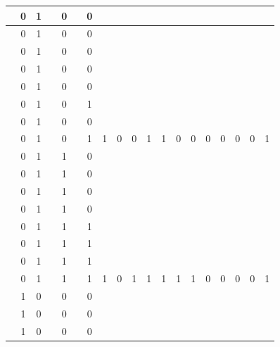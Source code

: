 \begin{table}[!tb]
\begin{tabular}{|c|c|c|c|c|c|c|c|c|c|c|c|c|c|c|c|c|c|c|}
        \rowcolor{red!40}  & 0 & 1 &  & 0 &  & 0 &  &  &  &  &  &  &  &  &  &  &  &  \\ \hline
        \rowcolor{red!40}  & 0 & 1 &  & 0 &  & 0 &  &  &  &  &  &  &  &  &  &  &  &  \\ \hline
        \rowcolor{red!40}  & 0 & 1 &  & 0 &  & 0 &  &  &  &  &  &  &  &  &  &  &  &  \\ \hline
        \rowcolor{red!40}  & 0 & 1 &  & 0 &  & 0 &  &  &  &  &  &  &  &  &  &  &  &  \\ \hline
        \rowcolor{red!40}  & 0 & 1 &  & 0 &  & 0 &  &  &  &  &  &  &  &  &  &  &  &  \\ \hline
        \rowcolor{red!40}  & 0 & 1 &  & 0 &  & 1 &  &  &  &  &  &  &  &  &  &  &  &  \\ \hline
        \rowcolor{red!40}  & 0 & 1 &  & 0 &  & 0 &  &  &  &  &  &  &  &  &  &  &  &  \\ \hline
        \rowcolor{red!40}  & 0 & 1 &  & 0 &  & 1 & 1 & 0 & 0 & 1 & 1 & 0 & 0 & 0 & 0 & 0 & 0 & 1 \\ \hline
        \rowcolor{green!40}  & 0 & 1 &  & 1 &  & 0 &  &  &  &  &  &  &  &  &  &  &  &  \\ \hline
        \rowcolor{green!40}  & 0 & 1 &  & 1 &  & 0 &  &  &  &  &  &  &  &  &  &  &  &  \\ \hline
        \rowcolor{green!40}  & 0 & 1 &  & 1 &  & 0 &  &  &  &  &  &  &  &  &  &  &  &  \\ \hline
        \rowcolor{green!40}  & 0 & 1 &  & 1 &  & 0 &  &  &  &  &  &  &  &  &  &  &  &  \\ \hline
        \rowcolor{green!40}  & 0 & 1 &  & 1 &  & 1 &  &  &  &  &  &  &  &  &  &  &  &  \\ \hline
        \rowcolor{green!40}  & 0 & 1 &  & 1 &  & 1 &  &  &  &  &  &  &  &  &  &  &  &  \\ \hline
        \rowcolor{green!40}  & 0 & 1 &  & 1 &  & 1 &  &  &  &  &  &  &  &  &  &  &  &  \\ \hline
        \rowcolor{green!40}  & 0 & 1 &  & 1 &  & 1 & 1 & 0 & 1 & 1 & 1 & 1 & 1 & 0 & 0 & 0 & 0 & 1 \\ \hline
        \rowcolor{yellow!40}  & 1 & 0 &  & 0 &  & 0 &  &  &  &  &  &  &  &  &  &  &  &  \\ \hline
        \rowcolor{yellow!40}  & 1 & 0 &  & 0 &  & 0 &  &  &  &  &  &  &  &  &  &  &  &  \\ \hline
        \rowcolor{yellow!40}  & 1 & 0 &  & 0 &  & 0 &  &  &  &  &  &  &  &  &  &  &  &  \\ \hline

\end{tabular}
\end{table}
